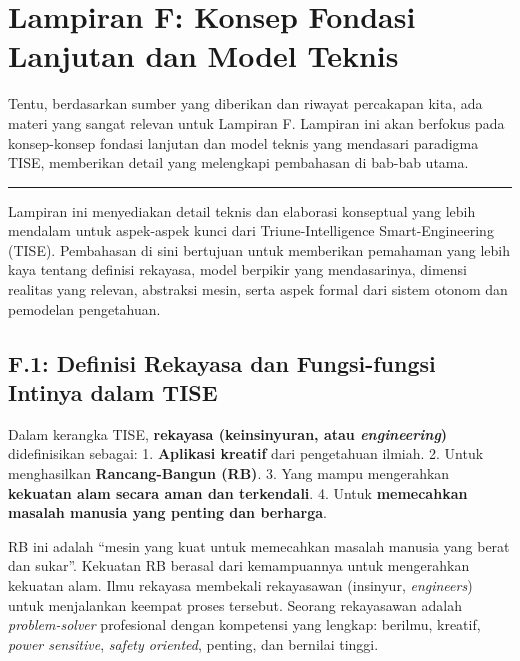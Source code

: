 \documentclass[
  letterpaper,
  DIV=11,
  numbers=noendperiod]{scrreprt}
\begin{document}
\chapter{\texorpdfstring{\textbf{Lampiran F: Konsep Fondasi Lanjutan dan
Model
Teknis}}{Lampiran F: Konsep Fondasi Lanjutan dan Model Teknis}}\label{lampiran-f-konsep-fondasi-lanjutan-dan-model-teknis}

Tentu, berdasarkan sumber yang diberikan dan riwayat percakapan kita,
ada materi yang sangat relevan untuk Lampiran F. Lampiran ini akan
berfokus pada konsep-konsep fondasi lanjutan dan model teknis yang
mendasari paradigma TISE, memberikan detail yang melengkapi pembahasan
di bab-bab utama.

\begin{center}\rule{0.5\linewidth}{0.5pt}\end{center}

Lampiran ini menyediakan detail teknis dan elaborasi konseptual yang
lebih mendalam untuk aspek-aspek kunci dari Triune-Intelligence
Smart-Engineering (TISE). Pembahasan di sini bertujuan untuk memberikan
pemahaman yang lebih kaya tentang definisi rekayasa, model berpikir yang
mendasarinya, dimensi realitas yang relevan, abstraksi mesin, serta
aspek formal dari sistem otonom dan pemodelan pengetahuan.

\section{\texorpdfstring{\textbf{F.1: Definisi Rekayasa dan
Fungsi-fungsi Intinya dalam
TISE}}{F.1: Definisi Rekayasa dan Fungsi-fungsi Intinya dalam TISE}}\label{f.1-definisi-rekayasa-dan-fungsi-fungsi-intinya-dalam-tise}

Dalam kerangka TISE, \textbf{rekayasa (keinsinyuran, atau
\emph{engineering})} didefinisikan sebagai: 1. \textbf{Aplikasi kreatif}
dari pengetahuan ilmiah. 2. Untuk menghasilkan \textbf{Rancang-Bangun
(RB)}. 3. Yang mampu mengerahkan \textbf{kekuatan alam secara aman dan
terkendali}. 4. Untuk \textbf{memecahkan masalah manusia yang penting
dan berharga}.

RB ini adalah ``mesin yang kuat untuk memecahkan masalah manusia yang
berat dan sukar''. Kekuatan RB berasal dari kemampuannya untuk
mengerahkan kekuatan alam. Ilmu rekayasa membekali rekayasawan
(insinyur, \emph{engineers}) untuk menjalankan keempat proses tersebut.
Seorang rekayasawan adalah \emph{problem-solver} profesional dengan
kompetensi yang lengkap: berilmu, kreatif, \emph{power sensitive},
\emph{safety oriented}, penting, dan bernilai tinggi.
\end{document}
